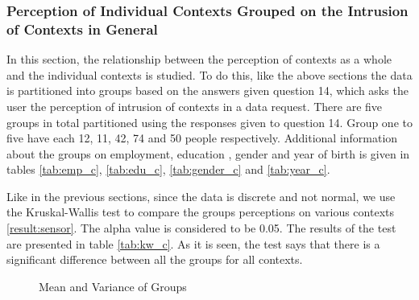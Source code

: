 \subsubsection{Perception of Individual Contexts Grouped on the Intrusion of Contexts in General}

In this section, the relationship between the perception of contexts as a whole and the individual contexts is studied. 
To do this, like the above sections the data is partitioned into groups based on the answers given question 14, which asks the user the perception of intrusion of contexts in a data request. There are five groups in total partitioned using the responses given to question 14. Group one to five have each 12, 11, 42, 74 and 50 people respectively. Additional
information about the groups on employment, education , gender and year of birth is given in tables \ref{tab:emp_c}, \ref{tab:edu_c}, \ref{tab:gender_c} and \ref{tab:year_c}. 

Like in the previous sections, since the data is discrete and not normal, we use the Kruskal-Wallis test to compare the groups perceptions on various contexts \ref{result:sensor}. The alpha value is considered to be 0.05. The results of the test are presented in table \ref{tab:kw_c}. As it is seen, the test says that there is a significant difference between all the groups for all contexts.

\begin{figure}[htp]
\caption{Mean and Variance of Groups}
\label{fig:co3}
\end{figure}

